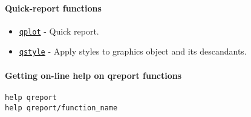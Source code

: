 

	\paragraph{Quick-report functions}\label{quick-report-functions}

\begin{itemize}
\itemsep1pt\parskip0pt
\item
  \href{qreport/qplot}{\texttt{qplot}} - Quick report.
\item
  \href{qreport/qstyle}{\texttt{qstyle}} - Apply styles to graphics
  object and its descandants.
\end{itemize}

\paragraph{Getting on-line help on qreport
functions}\label{getting-on-line-help-on-qreport-functions}

\begin{verbatim}
help qreport
help qreport/function_name
\end{verbatim}



